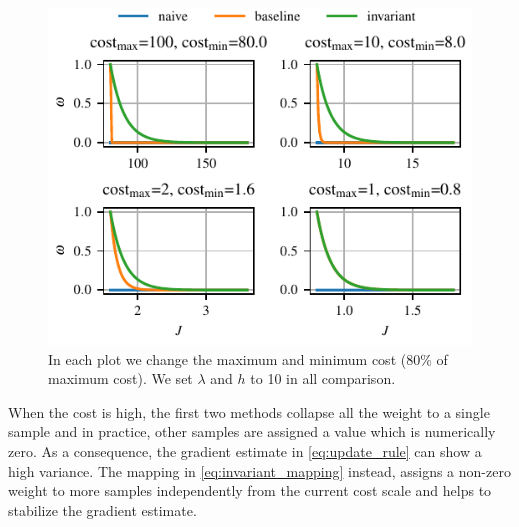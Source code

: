 \begin{figure}[t]
    \centering
    \includegraphics{figures/likelihood_mapping.pdf}
    \caption{In each plot we change the maximum and minimum cost ($80$\% of maximum cost). We set $\lambda$ and $h$ to 10 in all comparison.}
    \label{fig:exponential_mapping_comparison}
\end{figure}

When the cost is high, the first two methods collapse all the weight to a single sample and in practice, other samples are assigned a value which is numerically zero. As a consequence, the gradient estimate in \eqref{eq:update_rule} can show a high variance. The mapping in \eqref{eq:invariant_mapping} instead, assigns a non-zero weight to more samples independently from the current cost scale and helps to stabilize the gradient estimate.

